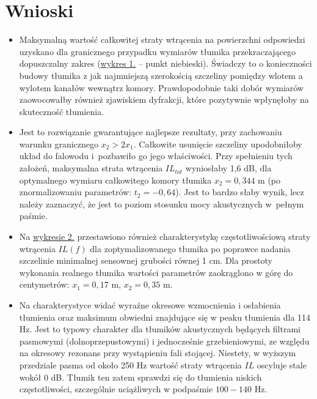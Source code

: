 \documentclass{sprawozdanie-agh}
\begin{document}
\section{Wnioski}
\begin{itemize}
\item Maksymalną wartość całkowitej straty wtrącenia na powierzchni odpowiedzi uzyskano dla granicznego przypadku wymiarów tłumika przekraczającego dopuszczalny zakres (\hyperref[plane]{wykres 1.} -- {\color{cyan}punkt niebieski}). Świadczy to o konieczności budowy tłumika z jak najmniejszą szerokością szczeliny pomiędzy wlotem a wylotem kanałów wewnątrz komory. Prawdopodobnie taki dobór wymiarów zaowocowałby również zjawiskiem dyfrakcji, które pozytywnie wpłynęłoby na skuteczność tłumienia.
\item Jest to rozwiązanie gwarantujące najlepsze rezultaty, przy zachowaniu warunku granicznego $x_2>2x_1$. Całkowite usunięcie szczeliny upodobniłoby układ do falowodu i~pozbawiło go jego właściwości. Przy spełnieniu tych założeń, maksymalna strata wtrącenia $IL_{tot}$ wyniosłaby 1,6 dB, dla optymalnego wymiaru całkowitego komory tłumika $x_2=0,344$ m (po znormalizowaniu parametrów: $t_2=-0,64$). Jest to bardzo słaby wynik, lecz należy zaznaczyć, że jest to poziom stosunku mocy akustycznych w~pełnym paśmie.
\item Na \hyperref[wykres2]{wykresie 2.} przestawiono również charakterystykę częstotliwościową straty wtrącenia $IL(f)$ dla zoptymalizowanego tłumika po poprawce nadania szczelinie minimalnej sensownej grubości równej 1 cm. Dla prostoty wykonania realnego tłumika wartości parametrów zaokrąglono w górę do centymetrów: $x_1=0,17$ m, $x_2=0,35$ m.
\item Na charakterystyce widać wyraźne okresowe wzmocnienia i osłabienia tłumienia oraz maksimum obwiedni znajdujące się w peaku tłumienia dla 114 Hz. Jest to typowy charakter dla tłumików akustycznych będących filtrami pasmowymi (dolnoprzepustowymi) i jednocześnie grzebieniowymi, ze względu na okresowy rezonans przy wystąpieniu fali stojącej. Niestety, w wyższym przedziale pasma od około 250 Hz wartość straty wtrącenia $IL$ oscyluje stale wokół 0 dB. Tłumik ten zatem sprawdzi się do tłumienia niskich częstotliwości, szczególnie uciążliwych w podpaśmie $100-140$ Hz.
\end{itemize}
\end{document}
